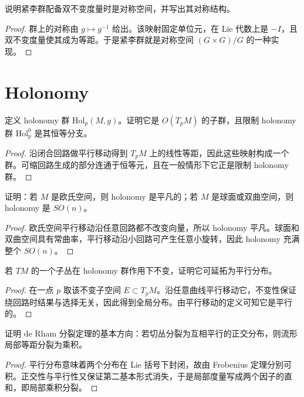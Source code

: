 \documentclass[11pt,a4paper,openany]{ctexbook}
\numberwithin{equation}{chapter}
\begin{document}
\begin{problem}
说明紧李群配备双不变度量时是对称空间，并写出其对称结构。
\end{problem}
\begin{proof}
群上的对称由 \(g\mapsto g^{-1}\) 给出。该映射固定单位元，在 Lie 代数上是 \(-I\)，且双不变度量使其成为等距。于是紧李群就是对称空间 \( (G\times G)/G \) 的一种实现。
\end{proof}

\section{Holonomy}

\begin{problem}
定义 holonomy 群 \(\mathrm{Hol}_p(M,g)\)。证明它是 \(O(T_pM)\) 的子群，且限制 holonomy 群 \(\mathrm{Hol}_p^0\) 是其恒等分支。
\end{problem}
\begin{proof}
沿闭合回路做平行移动得到 \(T_pM\) 上的线性等距，因此这些映射构成一个群。可缩回路生成的部分连通于恒等元，且在一般情形下它正是限制 holonomy 群。
\end{proof}

\begin{problem}
证明：若 \(M\) 是欧氏空间，则 holonomy 是平凡的；若 \(M\) 是球面或双曲空间，则 holonomy 是 \(SO(n)\)。
\end{problem}
\begin{proof}
欧氏空间平行移动沿任意回路都不改变向量，所以 holonomy 平凡。球面和双曲空间具有常曲率，平行移动沿小回路可产生任意小旋转，因此 holonomy 充满整个 \(SO(n)\)。
\end{proof}

\begin{problem}
若 \(TM\) 的一个子丛在 holonomy 群作用下不变，证明它可延拓为平行分布。
\end{problem}
\begin{proof}
在一点 \(p\) 取该不变子空间 \(E\subset T_pM\)。沿任意曲线平行移动它，不变性保证绕回路时结果与选择无关，因此得到全局分布。由平行移动的定义可知它是平行的。
\end{proof}

\begin{problem}
证明 de Rham 分裂定理的基本方向：若切丛分裂为互相平行的正交分布，则流形局部等距分裂为乘积。
\end{problem}
\begin{proof}
平行分布意味着两个分布在 Lie 括号下封闭，故由 Frobenius 定理分别可积。正交性与平行性又保证第二基本形式消失，于是局部度量写成两个因子的直和，即局部乘积分裂。
\end{proof}
\end{document}
